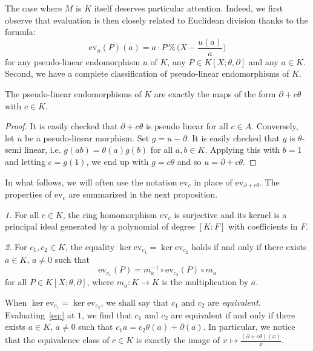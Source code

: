 \documentclass[a4paper]{llncs}
\newcommand{\ev}[1]{\textrm{ev}_{#1}}
\renewcommand{\mod}{\,\%\,}
\begin{document}
The case where $M$ is $K$ itself deserves particular attention.
Indeed, we first observe that evaluation is then closely related to
Euclidean division thanks to the formula:
$$\textstyle \ev{u}(P)(a) = 
a \cdot P \mod \big(X - \frac{u(a)}{a}\big)$$
for any pseudo-linear endomorphism $u$ of $K$, any $P \in K[X;\theta,
\partial]$ and any $a \in K$. Second, we have a complete classification
of pseudo-linear endomorphisms of $K$.

\begin{proposition}
The pseudo-linear endomorphisms of $K$ are exactly the maps of
the form $\partial + c\theta$ with $c \in K$.
\end{proposition}

\begin{proof}
It is easily checked that $\partial + c\theta$ is pseudo linear
for all $c\in A$. Conversely, let $u$ be a pseudo-linear morphism.
Set $g = u - \partial$. It is easily checked that $g$ is 
$\theta$-semi linear, i.e. $g(ab) = \theta(a) g(b)$ for all $a, b 
\in K$. Applying this with $b = 1$ and letting $c = g(1)$, we end
up with $g = c \theta$ and so $u = \partial + c\theta$.
\end{proof}

In what follows, we will often use the notation $\ev c$ in place of 
$\ev{\partial + c \theta}$. The properties of $\ev c$ are summarized
in the next proposition.

\begin{proposition}
\label{prop:evc}
\noindent
\textit{1.}
For all $c \in K$, the ring homomorphism $\ev{c}$ is surjective
and its kernel is a principal ideal generated by a polynomial of
degree $[K:F]$ with coefficients in $F$.

\noindent
\textit{2.}
For $c_1, c_2 \in K$, the equality $\ker \ev{c_1} = \ker \ev{c_2}$ holds 
if and only if there exists $a \in K$, $a \neq 0$ such that 
\begin{equation}
\label{eq:}
\ev{c_1}(P) = m_a^{-1} \circ \ev{c_2}(P) \circ m_a
\end{equation}
for all $P \in K[X;\theta,\partial]$, where $m_a : K \to K$ is the
multiplication by $a$.
\end{proposition}

When $\ker \ev{c_1} = \ker \ev{c_2}$, we shall say that $c_1$
and $c_2$ are \emph{equivalent}. Evaluating~\eqref{eq:} at $1$,
we find that $c_1$ and $c_2$ are equivalent if and only if there
exists $a \in K$, $a \neq 0$ such that
$c_1 a = c_2 \theta(a) + \partial(a)$. In particular, we notice 
that the equivalence class of $c \in K$ is exactly the image of 
$x \mapsto \frac{(\partial + c\theta)(x)} x$.
\end{document}
